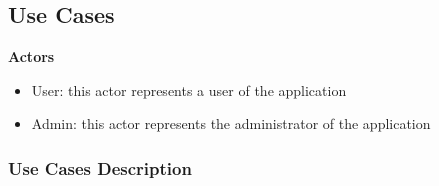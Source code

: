 \documentclass[a4paper, oneside]{article}
\begin{document}
\clearpage

\subsection{Use Cases}

\textbf{Actors}
\begin{itemize}
\item{User: this actor represents a user of the application}
\item{Admin: this actor represents the administrator of the application}
\end{itemize}

\subsubsection{Use Cases Description}
\end{document}
